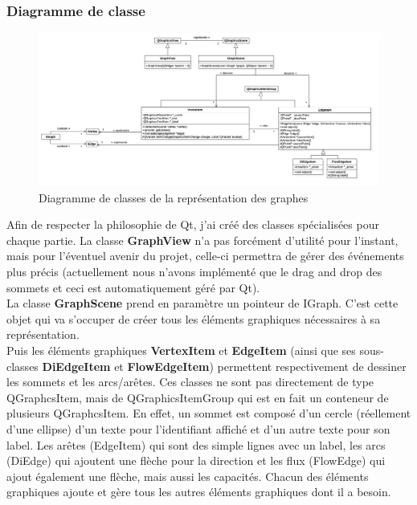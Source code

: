 \documentclass[french]{article}
\begin{document}
	\subsubsection{Diagramme de classe}
	\begin{figure}[H]
		\centering
		\includegraphics[width=0.9\textheight,angle=90]{Conception/visualization/visualization.png}
		\caption{Diagramme de classes de la représentation des graphes}
	\end{figure}
	
	\pagebreak
	
	Afin de respecter la philosophie de Qt, j'ai créé des classes spécialisées pour chaque partie. La classe \textbf{GraphView} n'a pas forcément d'utilité pour l'instant, mais pour l'éventuel avenir du projet, celle-ci permettra de gérer des événements plus précis (actuellement nous n'avons implémenté que le drag and drop des sommets et ceci est automatiquement géré par Qt). \\
	La classe \textbf{GraphScene} prend en paramètre un pointeur de IGraph. C'est cette objet qui va s'occuper de créer tous les éléments graphiques nécessaires à sa représentation. \\
	Puis les éléments graphiques \textbf{VertexItem} et \textbf{EdgeItem} (ainsi que ses sous-classes \textbf{DiEdgeItem} et \textbf{FlowEdgeItem}) permettent respectivement de dessiner les sommets et les arcs/arêtes. Ces classes ne sont pas directement de type QGraphcsItem, mais de QGraphicsItemGroup qui est en fait un conteneur de plusieurs QGraphcsItem. En effet, un sommet est composé d'un cercle (réellement d'une ellipse) d'un texte pour l'identifiant affiché et d'un autre texte pour son label. Les arêtes (EdgeItem) qui sont des simple lignes avec un label, les arcs (DiEdge) qui ajoutent une flèche pour la direction et les flux (FlowEdge) qui ajout également une flèche, mais aussi les capacités. Chacun des éléments graphiques ajoute et gère tous les autres éléments graphiques dont il a besoin. \\
	
\end{document}
